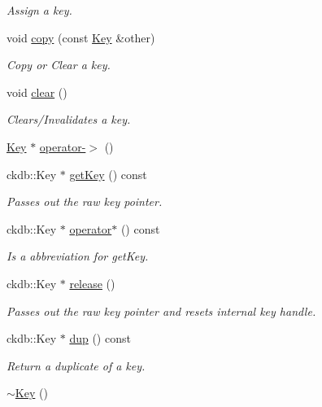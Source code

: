 \begin{DoxyCompactItemize}
\begin{DoxyCompactList}\small\item\em Assign a key. \end{DoxyCompactList}\item 
void \hyperlink{classkdb_1_1Key_ab5bc93e22f4cf40b9d2b1fc32cc260be}{copy} (const \hyperlink{classkdb_1_1Key}{Key} \&other)
\begin{DoxyCompactList}\small\item\em Copy or Clear a key. \end{DoxyCompactList}\item 
void \hyperlink{classkdb_1_1Key_a33a112681b0b2e94e6d369c0f89e361b}{clear} ()
\begin{DoxyCompactList}\small\item\em Clears/\+Invalidates a key. \end{DoxyCompactList}\item 
\hyperlink{classkdb_1_1Key}{Key} $\ast$ \hyperlink{classkdb_1_1Key_ab64ec9d578e083dad3e43322535cf108}{operator-\/$>$} ()
\item 
ckdb\+::\+Key $\ast$ \hyperlink{classkdb_1_1Key_a6be9b3bb17434fd4362d137183d51100}{get\+Key} () const
\begin{DoxyCompactList}\small\item\em Passes out the raw key pointer. \end{DoxyCompactList}\item 
ckdb\+::\+Key $\ast$ \hyperlink{classkdb_1_1Key_a66e5af2387ebb86efa465ba2e844cafd}{operator$\ast$} () const
\begin{DoxyCompactList}\small\item\em Is a abbreviation for get\+Key. \end{DoxyCompactList}\item 
ckdb\+::\+Key $\ast$ \hyperlink{classkdb_1_1Key_a9ae719043e6e99f5f3d6fb85837306f8}{release} ()
\begin{DoxyCompactList}\small\item\em Passes out the raw key pointer and resets internal key handle. \end{DoxyCompactList}\item 
ckdb\+::\+Key $\ast$ \hyperlink{classkdb_1_1Key_ababb1ccd9f18db379eb4a62f8db87bf5}{dup} () const
\begin{DoxyCompactList}\small\item\em Return a duplicate of a key. \end{DoxyCompactList}\item 
\hyperlink{classkdb_1_1Key_a35dd6ae58d125a298e30aed13b15c1f4}{$\sim$\+Key} ()

\end{DoxyCompactItemize}

